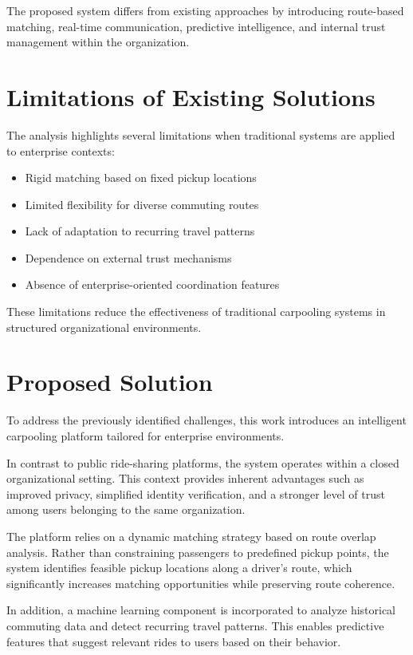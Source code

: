 The proposed system differs from existing approaches by introducing route-based matching, real-time communication, predictive intelligence, and internal trust management within the organization.

\section{Limitations of Existing Solutions}

The analysis highlights several limitations when traditional systems are applied to enterprise contexts:

\begin{itemize}
    \item Rigid matching based on fixed pickup locations
    \item Limited flexibility for diverse commuting routes
    \item Lack of adaptation to recurring travel patterns
    \item Dependence on external trust mechanisms
    \item Absence of enterprise-oriented coordination features
\end{itemize}

These limitations reduce the effectiveness of traditional carpooling systems in structured organizational environments.

\section{Proposed Solution}

To address the previously identified challenges, this work introduces an intelligent carpooling platform tailored for enterprise environments.

In contrast to public ride-sharing platforms, the system operates within a closed organizational setting. This context provides inherent advantages such as improved privacy, simplified identity verification, and a stronger level of trust among users belonging to the same organization.

The platform relies on a dynamic matching strategy based on route overlap analysis. Rather than constraining passengers to predefined pickup points, the system identifies feasible pickup locations along a driver’s route, which significantly increases matching opportunities while preserving route coherence.

In addition, a machine learning component is incorporated to analyze historical commuting data and detect recurring travel patterns. This enables predictive features that suggest relevant rides to users based on their behavior.

